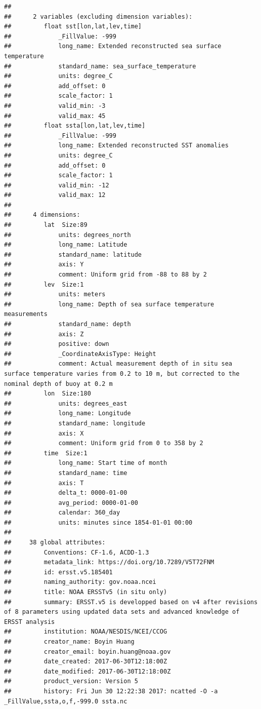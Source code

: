 \documentclass{article}\usepackage[]{graphicx}\usepackage[]{color}
\makeatletter
\newenvironment{kframe}{%
 \def\at@end@of@kframe{}%
 \ifinner\ifhmode%
  \def\at@end@of@kframe{\end{minipage}}%
  \begin{minipage}{\columnwidth}%
 \fi\fi%
 \def\FrameCommand##1{\hskip\@totalleftmargin \hskip-\fboxsep
 \colorbox{shadecolor}{##1}\hskip-\fboxsep
     \hskip-\linewidth \hskip-\@totalleftmargin \hskip\columnwidth}%
 \MakeFramed {\advance\hsize-\width
   \@totalleftmargin\z@ \linewidth\hsize
   \@setminipage}}%
 {\par\unskip\endMakeFramed%
 \at@end@of@kframe}
\newenvironment{knitrout}{}{} %
\makeatother
\begin{document}
\begin{knitrout}
\begin{kframe}
\begin{verbatim}
## 
##      2 variables (excluding dimension variables):
##         float sst[lon,lat,lev,time]   
##             _FillValue: -999
##             long_name: Extended reconstructed sea surface temperature
##             standard_name: sea_surface_temperature
##             units: degree_C
##             add_offset: 0
##             scale_factor: 1
##             valid_min: -3
##             valid_max: 45
##         float ssta[lon,lat,lev,time]   
##             _FillValue: -999
##             long_name: Extended reconstructed SST anomalies
##             units: degree_C
##             add_offset: 0
##             scale_factor: 1
##             valid_min: -12
##             valid_max: 12
## 
##      4 dimensions:
##         lat  Size:89
##             units: degrees_north
##             long_name: Latitude
##             standard_name: latitude
##             axis: Y
##             comment: Uniform grid from -88 to 88 by 2
##         lev  Size:1
##             units: meters
##             long_name: Depth of sea surface temperature measurements
##             standard_name: depth
##             axis: Z
##             positive: down
##             _CoordinateAxisType: Height
##             comment: Actual measurement depth of in situ sea surface temperature varies from 0.2 to 10 m, but corrected to the nominal depth of buoy at 0.2 m
##         lon  Size:180
##             units: degrees_east
##             long_name: Longitude
##             standard_name: longitude
##             axis: X
##             comment: Uniform grid from 0 to 358 by 2
##         time  Size:1
##             long_name: Start time of month
##             standard_name: time
##             axis: T
##             delta_t: 0000-01-00
##             avg_period: 0000-01-00
##             calendar: 360_day
##             units: minutes since 1854-01-01 00:00
## 
##     38 global attributes:
##         Conventions: CF-1.6, ACDD-1.3
##         metadata_link: https://doi.org/10.7289/V5T72FNM
##         id: ersst.v5.185401
##         naming_authority: gov.noaa.ncei
##         title: NOAA ERSSTv5 (in situ only)
##         summary: ERSST.v5 is developped based on v4 after revisions of 8 parameters using updated data sets and advanced knowledge of ERSST analysis
##         institution: NOAA/NESDIS/NCEI/CCOG
##         creator_name: Boyin Huang
##         creator_email: boyin.huang@noaa.gov
##         date_created: 2017-06-30T12:18:00Z
##         date_modified: 2017-06-30T12:18:00Z
##         product_version: Version 5
##         history: Fri Jun 30 12:22:38 2017: ncatted -O -a _FillValue,ssta,o,f,-999.0 ssta.nc

\end{verbatim}
\end{kframe}
\end{knitrout}
\end{document}
